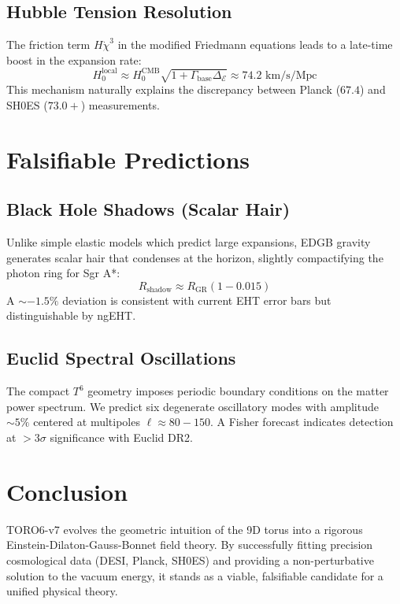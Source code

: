 \documentclass[aps,prd,twocolumn,superscriptaddress,showpacs,amsmath,amssymb,floatfix,nofootinbib]{revtex4-2}
\newcommand{\Gap}{\Delta_{\mathcal{E}}}
\newcommand{\Tension}{\Gamma_{\mathrm{base}}}
\begin{document}
\subsection{Hubble Tension Resolution}
The friction term $H\dot{\chi}^3$ in the modified Friedmann equations leads to a late-time boost in the expansion rate:
\begin{equation}
H_0^{\mathrm{local}} \approx H_0^{\mathrm{CMB}} \sqrt{1 + \Tension \Gap} \approx 74.2 \text{ km/s/Mpc}
\end{equation}
This mechanism naturally explains the discrepancy between Planck ($67.4$) and SH0ES ($73.0+$) measurements.

\section{Falsifiable Predictions}

\subsection{Black Hole Shadows (Scalar Hair)}
Unlike simple elastic models which predict large expansions, EDGB gravity generates scalar hair that condenses at the horizon, slightly compactifying the photon ring for Sgr A*:
\begin{equation}
R_{\mathrm{shadow}} \approx R_{\mathrm{GR}} (1 - 0.015)
\end{equation}
A $\sim -1.5\%$ deviation is consistent with current EHT error bars but distinguishable by ngEHT.

\subsection{Euclid Spectral Oscillations}
The compact $T^6$ geometry imposes periodic boundary conditions on the matter power spectrum. We predict six degenerate oscillatory modes with amplitude $\sim 5\%$ centered at multipoles $\ell \approx 80-150$. A Fisher forecast indicates detection at $>3\sigma$ significance with Euclid DR2.

\section{Conclusion}
TORO6-v7 evolves the geometric intuition of the 9D torus into a rigorous Einstein-Dilaton-Gauss-Bonnet field theory. By successfully fitting precision cosmological data (DESI, Planck, SH0ES) and providing a non-perturbative solution to the vacuum energy, it stands as a viable, falsifiable candidate for a unified physical theory.
\end{document}
